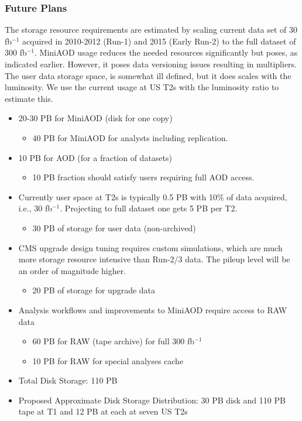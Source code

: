 \documentclass[11pt,a4paper]{article}
\begin{document}
\subsubsection{Future Plans}


The storage resource requirements are estimated by scaling current
data set of 30 fb$^{-1}$ acquired in 2010-2012 (Run-1) and 2015 (Early
Run-2) to the full dataset of 300 fb$^{-1}$.  MiniAOD usage reduces
the needed resources significantly but poses, as indicated earlier.
However, it poses data versioning issues resulting in multipliers.
The user data storage space, is somewhat ill defined, but it does
scales with the luminosity. We use the current usage at US T2s with
the luminosity ratio to estimate this.

\begin{itemize}
\item 20-30 PB for MiniAOD (disk for one copy)
\begin{itemize}
\item 40 PB for MiniAOD for analysts including replication.
\end{itemize}
\item 10 PB for AOD (for a fraction of datasets)
\begin{itemize}
\item 10 PB fraction should satisfy users requiring full AOD access.
\end{itemize}
\item Currently user space at T2s is typically 0.5 PB with 10\% of data acquired, i.e., 30 fb$^{-1}$.
Projecting to full dataset one gets 5 PB per T2.
\begin{itemize} 
\item 30 PB of storage for user data (non-archived)
\end{itemize}
\item CMS upgrade design tuning requires custom simulations, which are much more
storage resource intensive than Run-2/3 data.  The pileup level will be an order of
magnitude higher.
\begin{itemize} 
\item 20 PB of storage for upgrade data
\end{itemize} 
\item Analysis workflows and improvements to MiniAOD require access to RAW data
\begin{itemize}
\item 60 PB for RAW (tape archive) for full 300 fb$^{-1}$
\end{itemize} 
\begin{itemize}
\item 10 PB for RAW for special analyses cache
\end{itemize}
\item Total Disk Storage:  110 PB
\item Proposed Approximate Disk Storage Distribution: 30 PB disk and 110 PB tape at T1 and 12 PB at each at seven US T2s
\end{itemize}
\end{document}
